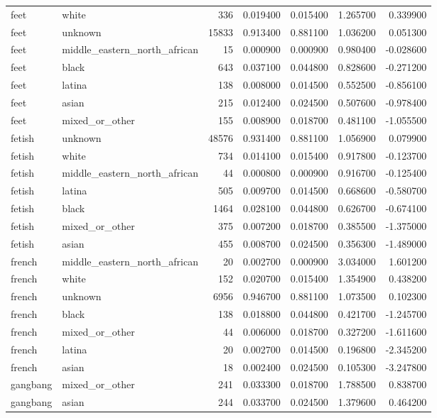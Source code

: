\begin{tabular}{llrrrrr}
feet & white & 336 & 0.019400 & 0.015400 & 1.265700 & 0.339900 \\
feet & unknown & 15833 & 0.913400 & 0.881100 & 1.036200 & 0.051300 \\
feet & middle_eastern_north_african & 15 & 0.000900 & 0.000900 & 0.980400 & -0.028600 \\
feet & black & 643 & 0.037100 & 0.044800 & 0.828600 & -0.271200 \\
feet & latina & 138 & 0.008000 & 0.014500 & 0.552500 & -0.856100 \\
feet & asian & 215 & 0.012400 & 0.024500 & 0.507600 & -0.978400 \\
feet & mixed_or_other & 155 & 0.008900 & 0.018700 & 0.481100 & -1.055500 \\
fetish & unknown & 48576 & 0.931400 & 0.881100 & 1.056900 & 0.079900 \\
fetish & white & 734 & 0.014100 & 0.015400 & 0.917800 & -0.123700 \\
fetish & middle_eastern_north_african & 44 & 0.000800 & 0.000900 & 0.916700 & -0.125400 \\
fetish & latina & 505 & 0.009700 & 0.014500 & 0.668600 & -0.580700 \\
fetish & black & 1464 & 0.028100 & 0.044800 & 0.626700 & -0.674100 \\
fetish & mixed_or_other & 375 & 0.007200 & 0.018700 & 0.385500 & -1.375000 \\
fetish & asian & 455 & 0.008700 & 0.024500 & 0.356300 & -1.489000 \\
french & middle_eastern_north_african & 20 & 0.002700 & 0.000900 & 3.034000 & 1.601200 \\
french & white & 152 & 0.020700 & 0.015400 & 1.354900 & 0.438200 \\
french & unknown & 6956 & 0.946700 & 0.881100 & 1.073500 & 0.102300 \\
french & black & 138 & 0.018800 & 0.044800 & 0.421700 & -1.245700 \\
french & mixed_or_other & 44 & 0.006000 & 0.018700 & 0.327200 & -1.611600 \\
french & latina & 20 & 0.002700 & 0.014500 & 0.196800 & -2.345200 \\
french & asian & 18 & 0.002400 & 0.024500 & 0.105300 & -3.247800 \\
gangbang & mixed_or_other & 241 & 0.033300 & 0.018700 & 1.788500 & 0.838700 \\
gangbang & asian & 244 & 0.033700 & 0.024500 & 1.379600 & 0.464200 \\

\end{tabular}
